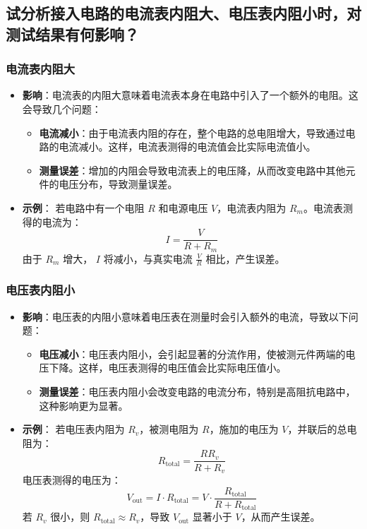 \documentclass[a4paper,utf8]{article}
\begin{document}
\subsection{试分析接入电路的电流表内阻大、电压表内阻小时，对测试结果有何影响？}
\subsubsection{电流表内阻大}
\begin{itemize}
    \item \textbf{影响}：电流表的内阻大意味着电流表本身在电路中引入了一个额外的电阻。这会导致几个问题：
    \begin{itemize}
        \item \textbf{电流减小}：由于电流表内阻的存在，整个电路的总电阻增大，导致通过电路的电流减小。这样，电流表测得的电流值会比实际电流值小。
        \item \textbf{测量误差}：增加的内阻会导致电流表上的电压降，从而改变电路中其他元件的电压分布，导致测量误差。
    \end{itemize}
    \item \textbf{示例}：
    若电路中有一个电阻 $R$ 和电源电压 $V$，电流表内阻为 $R_m$。电流表测得的电流为：
    \begin{equation}
    I = \frac{V}{R + R_m}
    \end{equation}
    由于 $R_m$ 增大， $I$ 将减小，与真实电流 $\frac{V}{R}$ 相比，产生误差。
\end{itemize}

\subsubsection{电压表内阻小}
\begin{itemize}
    \item \textbf{影响}：电压表的内阻小意味着电压表在测量时会引入额外的电流，导致以下问题：
    \begin{itemize}
        \item \textbf{电压减小}：电压表内阻小，会引起显著的分流作用，使被测元件两端的电压下降。这样，电压表测得的电压值会比实际电压值小。
        \item \textbf{测量误差}：电压表内阻小会改变电路的电流分布，特别是高阻抗电路中，这种影响更为显著。
    \end{itemize}
    \item \textbf{示例}：
    若电压表内阻为 $R_v$，被测电阻为 $R$，施加的电压为 $V$，并联后的总电阻为：
    \begin{equation}
    R_{\text{total}} = \frac{R R_v}{R + R_v}
    \end{equation}
    电压表测得的电压为：
    \begin{equation}
    V_{\text{out}} = I \cdot R_{\text{total}} = V \cdot \frac{R_{\text{total}}}{R + R_{\text{total}}}
    \end{equation}
    若 $R_v$ 很小，则 $R_{\text{total}} \approx R_v$，导致 $V_{\text{out}}$ 显著小于 $V$，从而产生误差。
\end{itemize}
\end{document}
